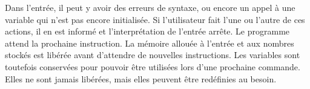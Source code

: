 \documentclass[letterpaper,12pt]{scrartcl}
\begin{document}
         Dans l'entrée, il peut y avoir des erreurs de syntaxe, ou encore un appel à une variable qui n'est pas encore initialisée. Si l'utilisateur fait l'une ou l'autre de ces actions, il en est informé et l'interprétation de l'entrée arrête. Le programme attend la prochaine instruction. La mémoire allouée à l'entrée et aux nombres stockés est libérée avant d'attendre de nouvelles instructions. Les variables sont toutefois conservées pour pouvoir être utilisées lors d'une prochaine commande. Elles ne sont jamais libérées, mais elles peuvent être redéfinies au besoin.
		
\end{document}
